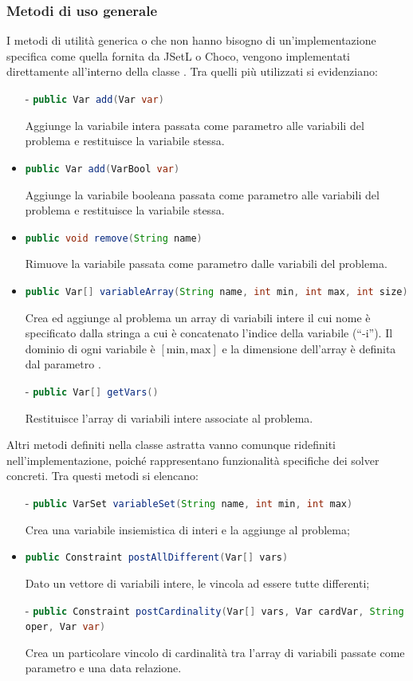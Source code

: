 \subsubsection{Metodi di uso generale}
I metodi di utilità generica o che non hanno bisogno di un'implementazione 
specifica
come quella fornita da JSetL o Choco, vengono implementati direttamente
all'interno della classe . Tra quelli più utilizzati
si evidenziano:
\begin{itemize}
\item[-]\lstinline[language = Java]$public Var add(Var var)$

Aggiunge la variabile intera passata come parametro 
alle variabili del problema e restituisce la variabile stessa.

\item[-]\lstinline[language = Java]$public Var add(VarBool var)$

Aggiunge la variabile booleana passata come parametro
 alle variabili del problema e restituisce la variabile stessa.

\item[-]\lstinline[language = Java]$public void remove(String name)$ 

Rimuove la variabile passata come parametro
 dalle variabili del problema.

\item[-]\lstinline[language = Java]$public Var[] variableArray(String name, int min, int max, int size)$

Crea ed aggiunge al problema un array di variabili
intere il cui nome è specificato dalla stringa  a cui
è concatenato l'indice della variabile (``-i''). Il dominio
di ogni variabile è $[\textrm{min}, \textrm{max}]$ e la dimensione dell'array 
è definita dal parametro .

\item[-]\lstinline[language = Java]$public Var[] getVars()$

Restituisce l'array di variabili intere
associate al problema.
\end{itemize}

Altri metodi definiti nella classe astratta vanno comunque ridefiniti
nell'implementazione, poiché rappresentano funzionalità specifiche
dei solver concreti. Tra questi metodi si elencano:
\begin{itemize}
\item[-]\lstinline[language = Java]$public VarSet variableSet(String name, int min, int max)$ 

Crea una variabile insiemistica di interi e la aggiunge al 
problema;
\item[-]\lstinline[language = Java]$public Constraint postAllDifferent(Var[] vars)$ 

Dato un vettore di variabili intere, le vincola ad essere tutte
differenti;
\item[-]\lstinline[language = Java]$public Constraint postCardinality(Var[] vars, Var cardVar, String oper, Var var)$ 

Crea un particolare vincolo di 
cardinalità tra l'array di variabili passate come parametro e una data 
relazione.
\end{itemize}

